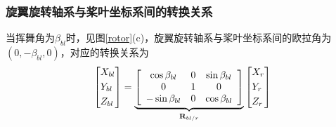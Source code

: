 \subsubsection{旋翼旋转轴系与桨叶坐标系间的转换关系}
当挥舞角为$\beta_{bl}$时，见图\ref{rotor}(c)，旋翼旋转轴系与桨叶坐标系间的欧拉角为$(0, -\beta_{bl}, 0)$，对应的转换关系为
\begin{equation}
  \left[ \begin{gathered}
    {X_{bl}} \hfill \\
    {Y_{bl}} \hfill \\
    {Z_{bl}} \hfill \\ 
  \end{gathered}  \right] = \underbrace {\left[ {\begin{array}{*{20}{c}}
    {\cos {\beta _{bl}}}&0&{\sin {\beta _{bl}}} \\ 
    0&1&0 \\ 
    { - \sin {\beta _{bl}}}&0&{\cos {\beta _{bl}}} 
  \end{array}} \right]}_{{{\mathbf{R}}_{bl/r}}}\left[ \begin{gathered}
    {X_r} \hfill \\
    {Y_r} \hfill \\
    {Z_r} \hfill \\ 
  \end{gathered}  \right]
\end{equation}
